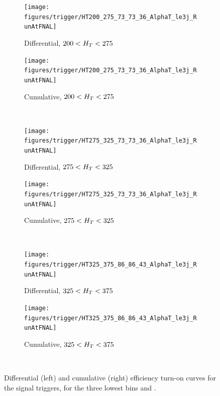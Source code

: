 \begin{figure}[p!]
  \centering
    \begin{subfigure}[b]{0.48\textwidth}
      \texttt{[image: figures/trigger/HT200\_275\_73\_73\_36\_AlphaT\_le3j\_RunAtFNAL]}
      \caption{Differential, $200 < H_T < 275 $ \gev}
    \end{subfigure}
    \begin{subfigure}[b]{0.48\textwidth}
      \texttt{[image: figures/trigger/HT200\_275\_73\_73\_36\_AlphaT\_le3j\_RunAtFNAL]}
      \caption{Cumulative, $200 < H_T < 275 $ \gev}
    \end{subfigure} \\
    \vspace{0.5cm}\begin{subfigure}[b]{0.48\textwidth}
      \texttt{[image: figures/trigger/HT275\_325\_73\_73\_36\_AlphaT\_le3j\_RunAtFNAL]}
      \caption{Differential, $275 < H_T < 325 $ \gev}
    \end{subfigure}
    \begin{subfigure}[b]{0.48\textwidth}
      \texttt{[image: figures/trigger/HT275\_325\_73\_73\_36\_AlphaT\_le3j\_RunAtFNAL]}
      \caption{Cumulative, $275 < H_T < 325 $ \gev}
    \end{subfigure} \\
    \vspace{0.5cm}\begin{subfigure}[b]{0.48\textwidth}
      \texttt{[image: figures/trigger/HT325\_375\_86\_86\_43\_AlphaT\_le3j\_RunAtFNAL]}
      \caption{Differential, $325 < H_T < 375 $ \gev}
    \end{subfigure}
    \begin{subfigure}[b]{0.48\textwidth}
      \texttt{[image: figures/trigger/HT325\_375\_86\_86\_43\_AlphaT\_le3j\_RunAtFNAL]}
      \caption{Cumulative, $325 < H_T < 375 $ \gev}
    \end{subfigure} \\
  
    \caption{\label{fig:eff_alphat_le3j}
      Differential (left) and cumulative (right) efficiency turn-on curves for 
      the signal triggers, for the three lowest \HT bins and \njlow.}
\end{figure}

